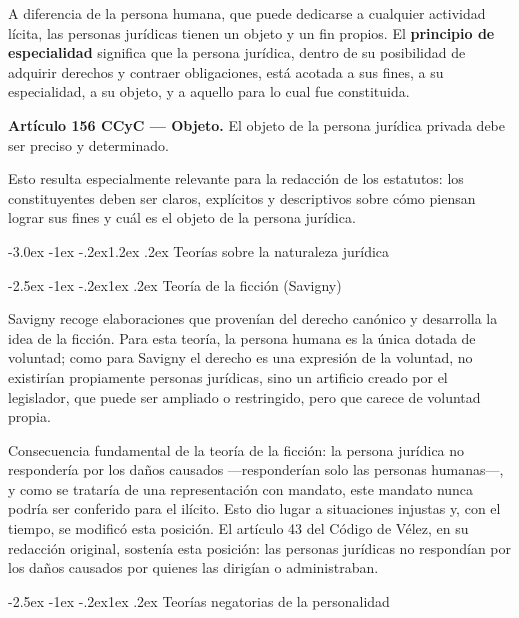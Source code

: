 \documentclass[12pt,oneside]{book}
\makeatletter
\renewcommand\section{\@startsection{section}{1}{\z@}%
  {-3.0ex \@plus -1ex \@minus -.2ex}{1.2ex \@plus .2ex}%
  {\normalfont\large\bfseries\color{acento}}}
\renewcommand\subsection{\@startsection{subsection}{2}{\z@}%
  {-2.5ex \@plus -1ex \@minus -.2ex}{1ex \@plus .2ex}%
  {\normalfont\normalsize\bfseries}}
\makeatother
\begin{document}
A diferencia de la persona humana, que puede dedicarse a cualquier actividad lícita, las personas jurídicas tienen un objeto y un fin propios. El \textbf{principio de especialidad} significa que la persona jurídica, dentro de su posibilidad de adquirir derechos y contraer obligaciones, está acotada a sus fines, a su especialidad, a su objeto, y a aquello para lo cual fue constituida.

\begin{importante}
\textbf{Artículo 156 CCyC --- Objeto.} El objeto de la persona jurídica privada debe ser preciso y determinado.
\end{importante}

Esto resulta especialmente relevante para la redacción de los estatutos: los constituyentes deben ser claros, explícitos y descriptivos sobre cómo piensan lograr sus fines y cuál es el objeto de la persona jurídica.

\section{Teorías sobre la naturaleza jurídica}

\subsection{Teoría de la ficción (Savigny)}

Savigny recoge elaboraciones que provenían del derecho canónico y desarrolla la idea de la ficción. Para esta teoría, la persona humana es la única dotada de voluntad; como para Savigny el derecho es una expresión de la voluntad, no existirían propiamente personas jurídicas, sino un artificio creado por el legislador, que puede ser ampliado o restringido, pero que carece de voluntad propia.

\begin{importante}
Consecuencia fundamental de la teoría de la ficción: la persona jurídica no respondería por los daños causados ---responderían solo las personas humanas---, y como se trataría de una representación con mandato, este mandato nunca podría ser conferido para el ilícito. Esto dio lugar a situaciones injustas y, con el tiempo, se modificó esta posición. El artículo 43 del Código de Vélez, en su redacción original, sostenía esta posición: las personas jurídicas no respondían por los daños causados por quienes las dirigían o administraban.
\end{importante}

\subsection{Teorías negatorias de la personalidad}
\end{document}
